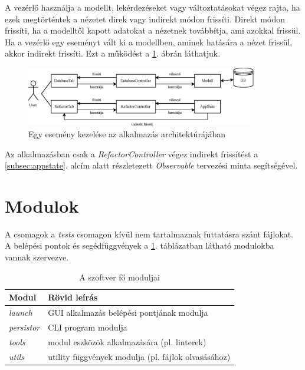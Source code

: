 A vezérlő használja a modellt, lekérdezéseket vagy változtatásokat végez rajta,
ha ezek megtörténtek a nézetet direk vagy indirekt módon frissíti.
Direkt módon frissíti, ha a modelltől kapott adatokat a nézetnek továbbítja,
ami azokkal frissül.
Ha a vezérlő egy eseményt vált ki a modellben, aminek hatására a nézet frissül,
akkor indirekt frissíti.
Ezt a működést a \ref{fig:MVC}. ábrán láthatjuk.

\begin{figure}[H]
	\centering
	\includegraphics[width=0.9\textwidth]{images/figs/MVC.eps}
	\caption{\label{fig:MVC}Egy esemény kezelése az alkalmazás architektúrájában}
\end{figure}

Az alkalmazásban csak a \emph{RefactorController} végez indirekt frissítést a
\ref{subsec:appstate}. alcím alatt részletezett \emph{Observable} tervezési minta
segítségével. 

\section{Modulok}
\label{sec:modules}

A csomagok a \emph{tests} csomagon kívül nem tartalmaznak futtatásra szánt fájlokat.
A belépési pontok és segédfüggvények a \ref{tab:modules}. táblázatban
látható modulokba vannak szervezve.

\begin{table}[H]
	\centering
	\begin{tabular}{ | m{} | m{} | }
		\hline
		\textbf{Modul} & \textbf{Rövid leírás} \\
		\hline \hline
		\emph{launch} & GUI alkalmazás belépési pontjának modulja \\
		\hline
		\emph{persistor} & CLI program modulja \\
		\hline
		\emph{tools} & modul eszközök alkalmazására (pl. linterek) \\
		\hline
		\emph{utils} & utility függvények modulja (pl. fájlok olvasásához)  \\
		\hline
	\end{tabular}
	\caption{A szoftver fő moduljai}
	\label{tab:modules}
\end{table}

